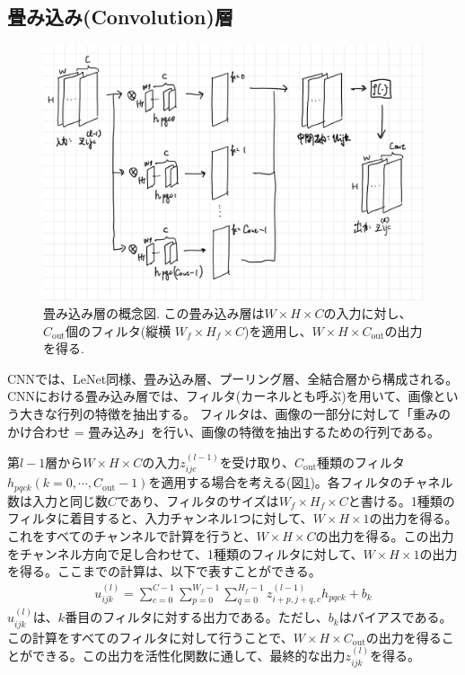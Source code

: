 \documentclass{ltjsarticle}
\begin{document}
\subsection{畳み込み(Convolution)層}
\begin{figure}
  \centering
  \includegraphics[width=12cm]{./capture/Convolution_layer.png}
  \caption{畳み込み層の概念図. この畳み込み層は$W\times H \times C$の入力に対し、$C_{\text{out}}$個のフィルタ(縦横 $W_f\times H_f \times C$)を適用し、$W\times H \times C_{\text{out}}$の出力を得る.}
  \label{fig:convolution_layer}
\end{figure}
CNNでは、LeNet同様、畳み込み層、プーリング層、全結合層から構成される。
CNNにおける畳み込み層では、フィルタ(カーネルとも呼ぶ)を用いて、画像という大きな行列の特徴を抽出する。
フィルタは、画像の一部分に対して「重みのかけ合わせ = 畳み込み」を行い、画像の特徴を抽出するための行列である。
\par
第$l-1$層から$W \times H\times C$の入力$z_{ijc}^{(l-1)}$を受け取り、$C_{\text{out}}$種類のフィルタ$h_{pqck}(k=0, \cdots, C_{\text{out}}-1)$を適用する場合を考える(図\ref{fig:convolution_layer})。各フィルタのチャネル数は入力と同じ数$C$であり、フィルタのサイズは$W_f \times H_f \times C$と書ける。1種類のフィルタに着目すると、入力チャンネル1つに対して、$W \times H \times 1$の出力を得る。これをすべてのチャンネルで計算を行うと、$W \times H \times C$の出力を得る。この出力をチャンネル方向で足し合わせて、1種類のフィルタに対して、$W \times H \times 1$の出力を得る。ここまでの計算は、以下で表すことができる。
\begin{align}
  u_{ijk}^{(l)} = \sum_{c=0}^{C-1}\sum_{p=0}^{W_f-1}\sum_{q=0}^{H_f-1}z_{i+p, j+q, c}^{(l-1)}h_{pqck} + b_k
\end{align}
$u_{ijk}^{(l)}$は、$k$番目のフィルタに対する出力である。ただし、$b_k$はバイアスである。この計算をすべてのフィルタに対して行うことで、$W \times H \times C_{\text{out}}$の出力を得ることができる。この出力を活性化関数に通して、最終的な出力$z_{ijk}^{(l)}$を得る。
\end{document}
